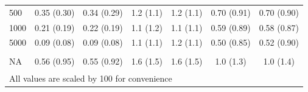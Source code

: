 \documentclass[AMA,STIX1COL,doublespace]{WileyNJD-v2}
\begin{document}
\begin{table}
\begin{tabular}[t]{lcccccc}
\hspace{1em}500 & 0.35 (0.30) & 0.34 (0.29) & 1.2 (1.1) & 1.2 (1.1) & 0.70 (0.91) & 0.70 (0.90)\\
\hspace{1em}1000 & 0.21 (0.19) & 0.22 (0.19) & 1.1 (1.2) & 1.1 (1.1) & 0.59 (0.89) & 0.58 (0.87)\\
\hspace{1em}5000 & 0.09 (0.08) & 0.09 (0.08) & 1.1 (1.1) & 1.2 (1.1) & 0.50 (0.85) & 0.52 (0.90)\\
\addlinespace[0.75em]
\multicolumn{7}{l}{\textbf{Overall}}\\
\hline
\hspace{1em}NA & 0.56 (0.95) & 0.55 (0.92) & 1.6 (1.5) & 1.6 (1.5) & 1.0 (1.3) & 1.0 (1.4)\\
\bottomrule
\multicolumn{7}{l}{\textsuperscript{} All values are scaled by 100 for convenience}\\
\end{tabular}
\end{table}
\end{document}

